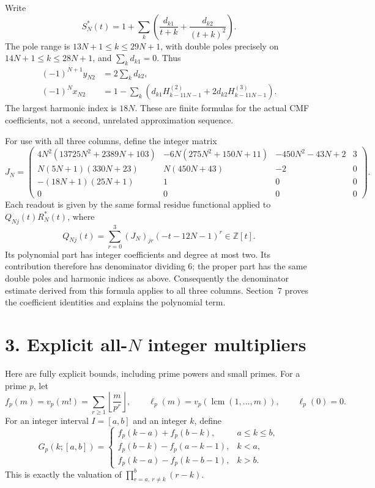 \documentclass[11pt]{article}
\newcommand{\Z}{\mathbb Z}
\DeclareMathOperator{\lcm}{lcm}
\begin{document}
Write
\[
 S_N^*(t)=1+\sum_k\left(\frac{d_{k1}}{t+k}+\frac{d_{k2}}{(t+k)^2}\right).
\]
The pole range is $13N+1\le k\le29N+1$, with double poles precisely on
$14N+1\le k\le28N+1$, and $\sum_kd_{k1}=0$. Thus
\begin{align*}
 (-1)^{N+1}y_{N2}&=2\sum_k d_{k2},\\
 (-1)^Nx_{N2}&=1-\sum_k\left(d_{k1}H_{k-11N-1}^{(2)}
                         +2d_{k2}H_{k-11N-1}^{(3)}\right).
\end{align*}
The largest harmonic index is $18N$. These are finite formulas for the
actual CMF coefficients, not a second, unrelated approximation sequence.

For use with all three columns, define the integer matrix
\[
 J_N=\begin{pmatrix}
 4N^2(13725N^2+2389N+103)&-6N(275N^2+150N+11)&-450N^2-43N+2&3\\
 N(5N+1)(330N+23)&N(450N+43)&-2&0\\
 -(18N+1)(25N+1)&1&0&0\\
 0&0&0&0
 \end{pmatrix}.
\]
Each readout is given by the same formal residue functional applied to
$Q_{Nj}(t)R_N^*(t)$, where
\[
 Q_{Nj}(t)=\sum_{r=0}^3(J_N)_{jr}(-t-12N-1)^r\in\Z[t].
\]
Its polynomial part has integer coefficients and degree at most two. Its
contribution therefore has denominator dividing $6$; the proper part has
the same double poles and harmonic indices as above. Consequently the
denominator estimate derived from this formula applies to all three columns.
Section~7 proves the coefficient identities and explains the polynomial term.

\section*{3. Explicit all-$N$ integer multipliers}
Here are fully explicit bounds, including prime powers and small primes.
For a prime $p$, let
\[
 f_p(m)=v_p(m!)=\sum_{r\ge1}\left\lfloor\frac m{p^r}\right\rfloor,
 \qquad \ell_p(m)=v_p(\lcm(1,\ldots,m)),\qquad \ell_p(0)=0.
\]
For an integer interval $I=[a,b]$ and an integer $k$, define
\[
 G_p(k;[a,b])=\begin{cases}
 f_p(k-a)+f_p(b-k),&a\le k\le b,\\
 f_p(b-k)-f_p(a-k-1),&k<a,\\
 f_p(k-a)-f_p(k-b-1),&k>b.
 \end{cases}
\]
This is exactly the valuation of $\prod_{r=a,\ r\ne k}^b(r-k)$.
\end{document}
